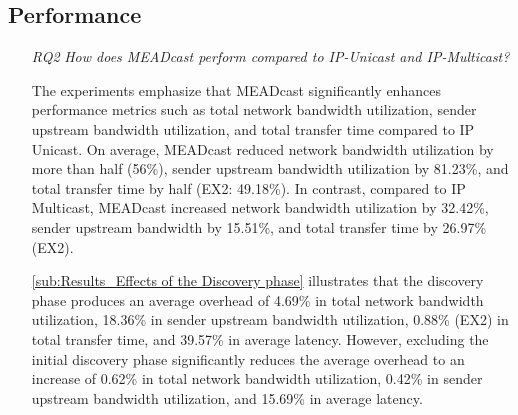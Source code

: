\subsection{Performance} %
\label{sub:discussion_Performance}
\begin{itemize}
\item[\textit{RQ2}]
    \textit{How does MEADcast perform compared to IP-Unicast and IP-Multicast?}
    

    The experiments emphasize that MEADcast significantly enhances performance
        metrics such as total network bandwidth utilization, sender upstream
        bandwidth utilization, and total transfer time compared to IP Unicast.
    On average, MEADcast reduced network bandwidth utilization by more than
        half (56\%), sender upstream bandwidth utilization by 81.23\%, and
        total transfer time by half (EX2: 49.18\%).
    In contrast, compared to IP Multicast, MEADcast increased network bandwidth
        utilization by 32.42\%, sender upstream bandwidth by 15.51\%, and total
        transfer time by 26.97\% (EX2).

    \autoref{sub:Results_Effects of the Discovery phase} illustrates that the discovery
        phase produces an average overhead of 4.69\% in total network bandwidth
        utilization, 18.36\% in sender upstream bandwidth utilization, 0.88\%
        (EX2) in total transfer time, and 39.57\% in average latency.
    However, excluding the initial discovery phase significantly reduces the 
        average overhead to an increase of 0.62\% in total network bandwidth
        utilization, 0.42\% in sender upstream bandwidth utilization, and
        15.69\% in average latency.


\end{itemize}
